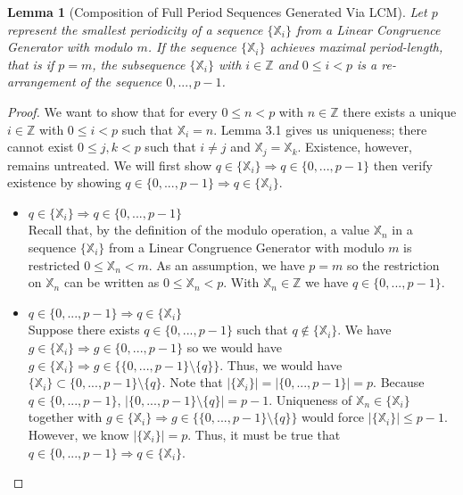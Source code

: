 \documentclass{article}
\theoremstyle{break}
\newtheorem{lemma}{Lemma}[section]
\begin{document}
\begin{lemma}[Composition of Full Period Sequences Generated Via LCM] \label{lma:comp_lcm_full_per_seq}
Let $p$ represent the smallest periodicity of a sequence $\{\mathbb{X}_i\}$ from a Linear Congruence Generator with modulo $m$. If the sequence $\{\mathbb{X}_i\}$ achieves maximal period-length, that is if $p = m$, the subsequence $\{\mathbb{X}_i\}$ with $i \in \mathbb{Z}$ and $0 \leq i < p$ is a re-arrangement of the sequence $0, ..., p - 1$.
\end{lemma}
\begin{proof} 
We want to show that for every $0 \leq n < p$ with $n \in \mathbb{Z}$ there exists a unique $i \in \mathbb{Z}$ with $0 \leq i <p$ such that $\mathbb{X}_i = n$. Lemma 3.1 gives us uniqueness; there cannot exist $0 \leq j,k < p$ such that $i \neq j$ and $\mathbb{X}_j = \mathbb{X}_k$. Existence, however, remains untreated. We will first show $q \in \{\mathbb{X}_i\} \Rightarrow q \in \{0, ..., p - 1\}$ then verify existence by showing $q \in \{0, ..., p - 1\} \Rightarrow q \in \{\mathbb{X}_i\}$.

\begin{itemize}

\item $q \in \{\mathbb{X}_i\} \Rightarrow q \in \{0, ..., p - 1\}$ \\
Recall that, by the definition of the modulo operation, a value $\mathbb{X}_n$ in a sequence $\{\mathbb{X}_i\}$ from a Linear Congruence Generator with modulo $m$ is restricted $0 \leq \mathbb{X}_n < m$. As an assumption, we have $p = m$ so the restriction on $\mathbb{X}_n$ can be written as $0 \leq \mathbb{X}_n < p$. With $\mathbb{X}_n \in \mathbb{Z}$ we have $q \in \{0, ..., p - 1\}$.

\item $q \in \{0, ..., p - 1\} \Rightarrow q \in \{\mathbb{X}_i\}$ \\
Suppose there exists $q \in \{0, ..., p - 1\}$ such that $q \notin \{\mathbb{X}_i\}$. We have $g \in \{\mathbb{X}_i\} \Rightarrow g \in \{0, ..., p - 1\}$ so we would have $g \in \{\mathbb{X}_i\} \Rightarrow g \in \{\{0,...,p-1\} \setminus \{q\}\}$. Thus, we would have $\{\mathbb{X}_i\} \subset {\{0, ..., p - 1\} \setminus \{q\}}$. Note that $\left\vert{\{\mathbb{X}_i\}}\right\vert = \left\vert{\{0, ..., p - 1\}}\right\vert = p$. Because $q \in \{0, ..., p - 1\}$, $\left\vert{\{0, ..., p - 1\} \setminus \{q\}}\right\vert = p - 1$. Uniqueness of $\mathbb{X}_n \in \{\mathbb{X}_i\}$ together with $g \in \{\mathbb{X}_i\} \Rightarrow g \in \{\{0,...,p-1\} \setminus \{q\}\}$ would force $\left\vert{\{\mathbb{X}_i\}}\right\vert \leq p - 1$. However, we know $\left\vert{\{\mathbb{X}_i\}}\right\vert = p$. Thus, it must be true that $q \in \{0, ..., p - 1\} \Rightarrow q \in \{\mathbb{X}_i\}$.
\end{itemize}

\end{proof} 
\end{document}
